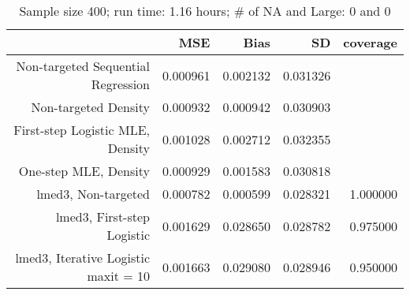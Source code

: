 \begin{table}[ht]
\centering
\caption{Sample size 400; run time: 1.16 hours; # of NA and Large:  0 and 0} 
\begin{tabular}{rrrrr}
  \hline
 & MSE & Bias & SD & coverage \\ 
  \hline
Non-targeted Sequential Regression & 0.000961 & 0.002132 & 0.031326 &  \\ 
  Non-targeted Density & 0.000932 & 0.000942 & 0.030903 &  \\ 
  First-step Logistic MLE, Density & 0.001028 & 0.002712 & 0.032355 &  \\ 
  One-step MLE, Density & 0.000929 & 0.001583 & 0.030818 &  \\ 
  lmed3, Non-targeted & 0.000782 & 0.000599 & 0.028321 & 1.000000 \\ 
  lmed3, First-step Logistic & 0.001629 & 0.028650 & 0.028782 & 0.975000 \\ 
  lmed3, Iterative Logistic maxit = 10 & 0.001663 & 0.029080 & 0.028946 & 0.950000 \\ 
   \hline
\end{tabular}
\end{table}
